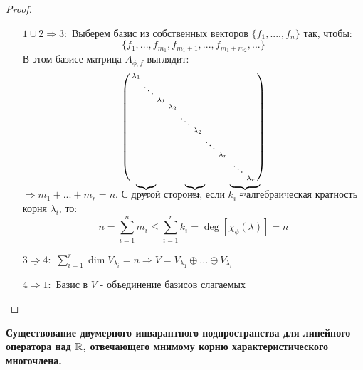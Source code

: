 \begin{proof}
\begin{itemize}
            \item[$\underline{1 \cup 2 \Rightarrow  3}:$] Выберем базис из собственных векторов $\{f_1,....,f_n\}$ так, чтобы: 
            $$\{f_1,...,f_{m_1},f_{m_1+1},...,f_{m_1+m_2},...\}$$
            В этом базисе матрица $A_{\phi, f}$ выглядит:
            \setcounter{MaxMatrixCols}{20}
            $$\left(\begin{smallmatrix}
                \lambda_1\\
                \null & \ddots \\
                \null & \null & \lambda_1 \\
                \null & \null & \null & \lambda_2 \\
                \null & \null & \null & \null & \ddots \\
                \null & \null & \null & \null & \null & \lambda_2 \\
                \null & \null & \null & \null & \null & \null & \ddots \\
                \null & \null & \null & \null & \null & \null & \null & \lambda_r \\
                \null & \null & \null & \null & \null & \null & \null & \null & \null & \ddots \\
                \undermat{m_1}{\null & \null & \null} & \null& \undermat{m_2}{\null & \null & \null} & \null & \undermat{m_r}{\null & \null & \lambda_r} \\
            \end{smallmatrix}\right) \vspace{0.7cm} $$ 
            $\Longrightarrow m_1+...+m_r = n$. С другой стороны, если $k_i$ - алгебраическая кратность корня $\lambda_i$, то:
            $$n = \sum \limits_{i=1}^nm_i \leq \sum \limits_{i=1}^rk_i = \deg [\chi_\phi(\lambda)] = n$$
            \item[$\underline{3 \Rightarrow 4}:$] $\sum \limits_{i=1}^r\dim V_{\lambda_i} = n \Longrightarrow V = V_{\lambda_1} \oplus ... \oplus V_{\lambda_r}$

            \item[$\underline{4 \Rightarrow  1}:$] Базис в $V$ - объединение базисов слагаемых 
        \end{itemize}
    \end{proof}
    
    

    \textbf{Существование двумерного инварантного подпространства для линейного оператора над $\mathbb R$, отвечающего мнимому корню характеристического многочлена.}
    
